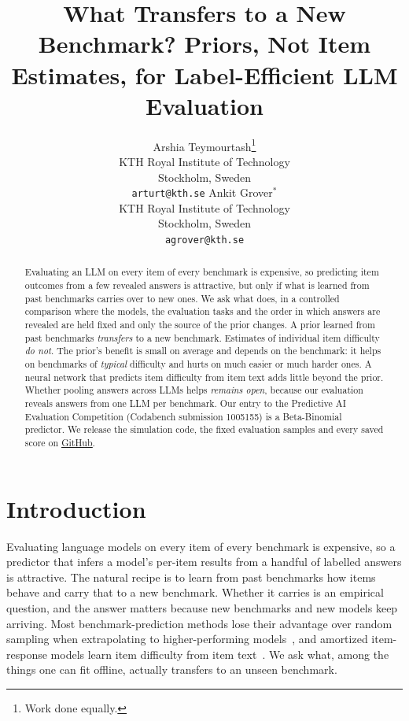 \documentclass{article}
\title{What Transfers to a New Benchmark? Priors, Not Item Estimates, for Label-Efficient LLM Evaluation}
\author{%
  Arshia Teymourtash\thanks{Work done equally.} \\
  KTH Royal Institute of Technology \\
  Stockholm, Sweden \\
  \texttt{arturt@kth.se}
  \And
  Ankit Grover$^{*}$ \\
  KTH Royal Institute of Technology \\
  Stockholm, Sweden \\
  \texttt{agrover@kth.se}
}
\newcommand{\ghlink}{\href{https://github.com/Agrover112/aims-neurips/tree/submission}{\textcolor[rgb]{0.05,0.25,0.65}{\underline{GitHub}}}}
\begin{document}
\maketitle

\begin{abstract}
Evaluating an LLM on every item of every benchmark is expensive, so predicting item outcomes from a few revealed answers is attractive, but only if what is learned from past benchmarks carries over to new ones. We ask what does, in a controlled comparison where the models, the evaluation tasks and the order in which answers are revealed are held fixed and only the source of the prior changes. A prior learned from past benchmarks \emph{transfers} to a new benchmark. Estimates of individual item difficulty \emph{do not}. The prior's benefit is small on average and depends on the benchmark: it helps on benchmarks of \emph{typical} difficulty and hurts on much easier or much harder ones. A neural network that predicts item difficulty from item text adds little beyond the prior. Whether pooling answers across LLMs helps \emph{remains open}, because our evaluation reveals answers from one LLM per benchmark. Our entry to the Predictive AI Evaluation Competition (Codabench submission 1005155) is a Beta-Binomial predictor. We release the simulation code, the fixed evaluation samples and every saved score on \ghlink.
\end{abstract}

\section{Introduction}

Evaluating language models on every item of every benchmark is expensive, so a predictor that infers a model's per-item results from a handful of labelled answers is attractive. The natural recipe is to learn from past benchmarks how items behave and carry that to a new benchmark. Whether it carries is an empirical question, and the answer matters because new benchmarks and new models keep arriving. Most benchmark-prediction methods lose their advantage over random sampling when extrapolating to higher-performing models~\citep{zhang2026benchmark}, and amortized item-response models learn item difficulty from item text~\citep{truong2025amortized}. We ask what, among the things one can fit offline, actually transfers to an unseen benchmark.
\end{document}

